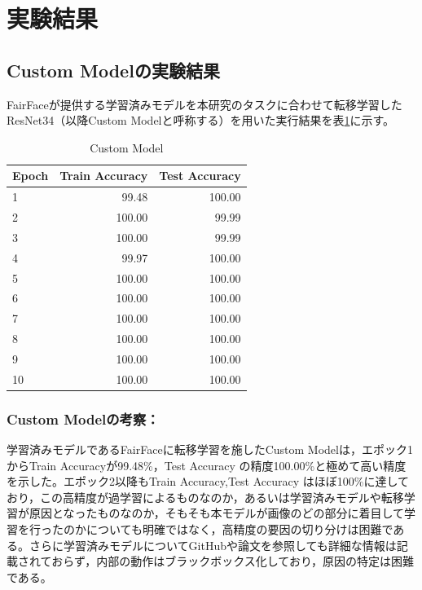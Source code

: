 \documentclass[a4paper,11pt,titlepage]{jsarticle}
\begin{document}
\clearpage
\section{実験結果}
\label{label:実験結果}
\subsection{Custom Modelの実験結果}
FairFaceが提供する学習済みモデルを本研究のタスクに合わせて転移学習したResNet34（以降Custom Modelと呼称する）を用いた実行結果を表\ref{tab:Custom}に示す。

\begin{table}[H]
\centering
\caption{Custom Model}
\label{tab:Custom}
\begin{tabular}{lrr}
\hline
 Epoch &  Train Accuracy &  Test Accuracy \\
\hline
     1 &           99.48 &               100.00 \\
     2 &          100.00 &                99.99 \\
     3 &          100.00 &                99.99 \\
     4 &           99.97 &               100.00 \\
     5 &          100.00 &               100.00 \\
     6 &          100.00 &               100.00 \\
     7 &          100.00 &               100.00 \\
     8 &          100.00 &               100.00 \\
     9 &          100.00 &               100.00 \\
    10 &          100.00 &               100.00 \\
\hline
\end{tabular}
\end{table}
% 

\subsubsection*{Custom Modelの考察：}
学習済みモデルであるFairFaceに転移学習を施したCustom Modelは，エポック1からTrain Accuracyが99.48\%，Test Accuracy の精度100.00\%と極めて高い精度を示した。エポック2以降もTrain Accuracy,Test Accuracy はほぼ100\%に達しており，この高精度が過学習によるものなのか，あるいは学習済みモデルや転移学習が原因となったものなのか，そもそも本モデルが画像のどの部分に着目して学習を行ったのかについても明確ではなく，高精度の要因の切り分けは困難である。さらに学習済みモデルについてGitHubや論文を参照しても詳細な情報は記載されておらず，内部の動作はブラックボックス化しており，原因の特定は困難である。\par
\end{document}
